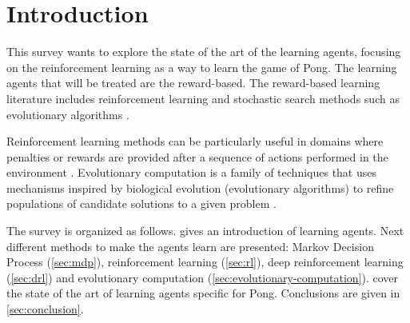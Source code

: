 \section{Introduction}
This survey wants to explore the state of the art of the learning agents, focusing on the reinforcement learning as a way to learn the game of Pong.
%
The learning agents that will be treated are the reward-based.
The reward-based learning literature includes reinforcement learning and stochastic search methods such as evolutionary algorithms \cite{panait2005cooperative}.

Reinforcement learning methods can be particularly useful in domains where penalties or rewards are provided after a sequence of actions performed in the environment \cite{panait2005cooperative}.
%
Evolutionary computation is a family of techniques that uses mechanisms inspired by biological evolution (evolutionary algorithms) to refine populations of candidate solutions to a given problem \cite{vikhar2016evolutionary}.

The survey is organized as follows.  gives an introduction of learning agents.
Next different methods to make the agents learn are presented: 
Markov Decision Process (\cref{sec:mdp}), reinforcement learning (\cref{sec:rl}), deep reinforcement learning (\cref{sec:drl}) and evolutionary computation (\cref{sec:evolutionary-computation}).
 cover the state of the art of learning agents specific for Pong. 
Conclusions are given in \cref{sec:conclusion}.  

